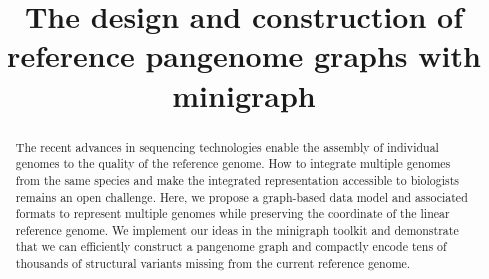 \documentclass[twocolumn]{bmcart}
\begin{document}
\begin{frontmatter}

\begin{fmbox}

\title{The design and construction of reference pangenome graphs with minigraph}

\author[
   addressref={aff1,aff2},          %
   corref={aff1},                   %
   email={hli@ds.dfci.harvard.edu}  %
]{ }
\author[
   addressref={aff1,aff2},
]{ }
\author[
   addressref={aff2},
]{ }

\address[id=aff1]{%
  , %
  ,                    %
}
\address[id=aff2]{%
  ,
  ,
}

\begin{abstractbox}

\begin{abstract} %
The recent advances in sequencing technologies enable the assembly of
individual genomes to the quality of the reference genome. How to integrate
multiple genomes from the same species and make the integrated representation
accessible to biologists remains an open challenge. Here, we propose a
graph-based data model and associated formats to represent multiple genomes
while preserving the coordinate of the linear reference genome. We implement
our ideas in the minigraph toolkit and demonstrate that we can efficiently
construct a pangenome graph and compactly encode tens of thousands of
structural variants missing from the current reference genome.
\end{abstract}

\begin{keyword}
\end{keyword}

\end{abstractbox}

\end{fmbox}

\end{frontmatter}
\end{document}
